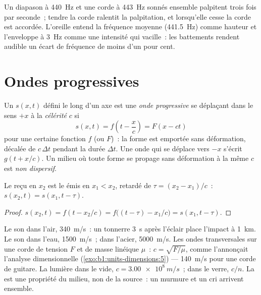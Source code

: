 \begin{example}\label{ex:b1:wave-propagation:tuning}
Un diapason à \qty{440}{Hz} et une corde à \qty{443}{Hz} sonnés ensemble
palpitent trois fois par seconde~; tendre la corde ralentit la
palpitation, et lorsqu'elle cesse la corde est accordée. L'oreille
entend la fréquence moyenne (\qty{441.5}{Hz}) comme hauteur et
l'enveloppe à \qty{3}{Hz} comme une intensité qui vacille~: les
battements rendent audible un écart de fréquence de moins d'un pour cent.
\end{example}

\section{Ondes progressives}

\begin{definition}\label{def:b1:wave-propagation:travelling}
Un  $s(x, t)$ défini le long d'un axe est une \emph{onde
progressive} se déplaçant dans le sens $+x$ à la \emph{célérité} $c$ si
\[
s(x, t) = f\!\left(t - \frac{x}{c}\right) = F(x - ct)
\]
pour une certaine fonction $f$ (ou $F$)~: la forme est emportée sans
déformation, décalée de $c\,\Delta t$ pendant la durée $\Delta t$. Une
onde qui se déplace vers $-x$ s'écrit $g(t + x/c)$. Un milieu où toute
forme se propage sans déformation à la même $c$ est \emph{non dispersif}.
\end{definition}

\begin{proposition}[Retard]\label{prop:b1:wave-propagation:delay}
Le  reçu en $x_2$ est le  émis en $x_1 < x_2$, retardé de
$\tau = (x_2 - x_1)/c$~: $s(x_2, t) = s(x_1, t - \tau)$.
\end{proposition}

\begin{proof}
$s(x_2, t) = f(t - x_2/c) = f\big((t - \tau) - x_1/c\big) = s(x_1, t - \tau)$.
\end{proof}

\begin{example}\label{ex:b1:wave-propagation:celerities}
Le son dans l'air, \qty{340}{m/s}~: un tonnerre \qty{3}{s} après
l'éclair place l'impact à \qty{1}{km}. Le son dans l'eau,
\qty{1500}{m/s}~; dans l'acier, \qty{5000}{m/s}. Les ondes transversales
sur une corde de tension $F$ et de masse linéique $\mu$~:
$c = \sqrt{F/\mu}$, comme l'annonçait l'analyse dimensionnelle
(\cref{exo:b1:units-dimensions:5}) --- \qty{140}{m/s} pour une corde de
guitare. La lumière dans le vide, $c = \qty{3.00e8}{m/s}$~; dans le
verre, $c/n$. La  est une propriété du milieu, non de la
source~: un murmure et un cri arrivent ensemble.
\end{example}

